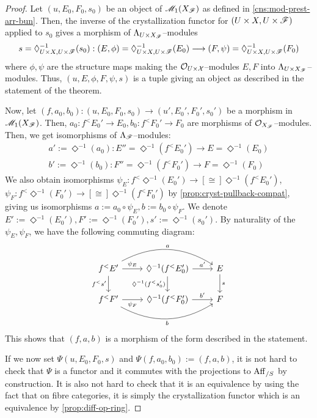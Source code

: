 \documentclass[11pt]{amsart}
\begin{document}
\begin{proof}
Let $(u, E_0, F_0, s_0)$ be an object of $\mathscr{M}_1(X_\mathscr{F})$ as defined in
\cref{cns:mod-prest-arr-bun}. Then, the inverse of the crystallization functor
for $(U \times X, U \times \mathscr{F})$ applied to $s_0$ gives a morphism of
$\Lambda_{U \times X_\mathscr{F}}$--modules
\[
s = \Diamond_{U \times X, U \times \sF}^{-1}(s_0) :
(E, \phi) = \Diamond_{U \times X, U \times \sF}^{-1}(E_0)
\to (F, \psi) = \Diamond_{U \times X, U \times \sF}^{-1}(F_0)
\]
where $\phi, \psi$ are the structure maps making the
$\mathcal{O}_{U \times \mathcal{X}}$--modules $E, F$ into
$\Lambda_{U \times X_\mathscr{F}}$--modules. Thus, $(u, E, \phi, F, \psi, s)$
is a tuple giving an object as described in the statement of the theorem.

Now, let $(f, a_0, b_0) : (u, E_0, F_0, s_0) \to (u', E_0', F_0', s_0')$
be a morphism in $\mathscr{M}_1(X_\mathscr{F})$. Then, $a_0 : f^<E_0' \to E_0,
b_0 : f^<F_0' \to F_0$ are morphisms of $\mathcal{O}_{X_\mathscr{F}}$--modules. Then,
we get isomorphisms of $\Lambda_{\mathscr{F}}$--modules:
\begin{align*}
a' := \Diamond^{-1}(a_0) :
E'' = \Diamond^{-1}(f^<E_0') \to E = \Diamond^{-1}(E_0) \\
b' := \Diamond^{-1}(b_0) :
F'' = \Diamond^{-1}(f^<F_0')\to F = \Diamond^{-1}(F_0)
\end{align*}
We also obtain isomorphisms
$\psi_E : f^<\Diamond^{-1}(E_0') \to[\cong] \Diamond^{-1}(f^<E_0')$,
$\psi_F : f^<\Diamond^{-1}(F_0') \to[\cong] \Diamond^{-1}(f^<F_0')$ by
\cref{prop:cryst-pullback-compat}, giving us isomorphisms
$a := a_0 \circ \psi_E, b := b_0 \circ \psi_F$. We denote
$E' := \Diamond^{-1}(E_0'), F' := \Diamond^{-1}(F_0'), s' := \Diamond^{-1}(s_0')$.
By naturality of the $\psi_E, \psi_F$, we have the following commuting diagram:
\[\begin{tikzcd}
f^<E' \ar[r, "\psi_E"] \ar[d, "f^<s'" left] \ar[rr, bend left, "a" above] &
\Diamond^{-1}(f^<E_0') \ar[r, "a'"] \ar[d,"\Diamond^{-1}(f^<s'_0)" left] &
E \ar[d, "s"] \\
f^<F' \ar[r, "\psi_F" below] \ar[rr, bend right, "b" below] &
\Diamond^{-1}(f^<F_0') \ar[r, "b'"] &
F
\end{tikzcd}\]
This shows that $(f, a, b)$ is a morphism of the form described in the statement.

If we now set $\Psi(u, E_0, F_0, s)$ and $\Psi(f, a_0, b_0) := (f, a, b)$,
it is not hard to check that $\Psi$ is a functor and it commutes with the
projections to $\mathrm{Aff}_{/S}$ by construction. It is also not hard to check that
it is an equivalence by using the fact that on fibre categories, it is simply
the crystallization functor which is an equivalence by \cref{prop:diff-op-ring}.
\end{proof}
\end{document}

